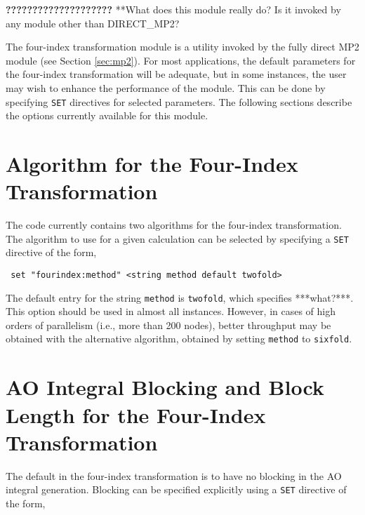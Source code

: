 \label{sec:fourindex}

{\bf ????????????????????}
\Large
**What does this module really do?  Is it invoked by any module other than
DIRECT\_MP2?
\normalsize


The four-index transformation module is a utility invoked by the fully
direct MP2 module (see Section \ref{sec:mp2}).  For most applications,
the default parameters for the four-index transformation will be adequate,
but in some instances, the user may wish to enhance the performance of
the module.  This can be done by specifying \verb+SET+ directives for
selected parameters.  The following sections describe the options
currently available for this module.

\section{Algorithm for the Four-Index Transformation}

The code currently contains two algorithms for the four-index transformation.
The algorithm to use for a given calculation can be selected by specifying
a \verb+SET+ directive of the form,

\begin{verbatim}
 set "fourindex:method" <string method default twofold>
\end{verbatim}

The default entry for the string \verb+method+ is \verb+twofold+, which
specifies ***what?***.  This option should be used in almost all instances.
However, in cases of high orders of parallelism (i.e., more than 200 nodes),
 better throughput may be obtained with the alternative algorithm, 
obtained by setting \verb+method+ to \verb+sixfold+.

\section{AO Integral Blocking and Block Length for the Four-Index Transformation}

The default in the four-index transformation is to have no blocking in
the AO integral generation.  Blocking can be specified explicitly using a
\verb+SET+ directive of the form,

